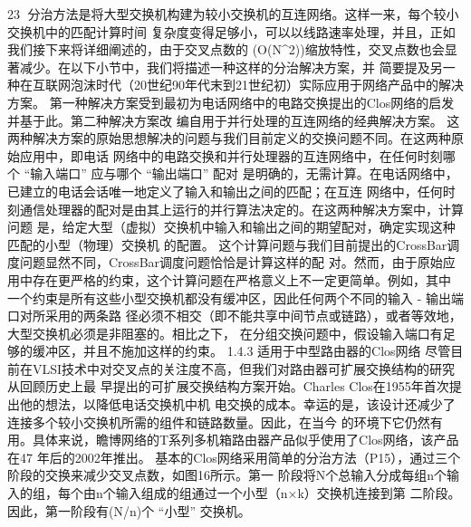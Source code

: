                                                           23
分治方法是将大型交换机构建为较小交换机的互连网络。这样一来，每个较小交换机中的匹配计算时间
复杂度变得足够小，可以以线路速率处理，并且，正如我们接下来将详细阐述的，由于交叉点数的
(O(N^{2}))缩放特性，交叉点数也会显著减少。在以下小节中，我们将描述一种这样的分治解决方案，并
简要提及另一种在互联网泡沫时代（20世纪90年代末到21世纪初）实际应用于网络产品中的解决方案。
第一种解决方案受到最初为电话网络中的电路交换提出的Clos网络的启发并基于此。第二种解决方案改
编自用于并行处理的互连网络的经典解决方案。
这两种解决方案的原始思想解决的问题与我们目前定义的交换问题不同。在这两种原始应用中，即电话
网络中的电路交换和并行处理器的互连网络中，在任何时刻哪个 “输入端口” 应与哪个 “输出端口” 配对
是明确的，无需计算。在电话网络中，已建立的电话会话唯一地定义了输入和输出之间的匹配；在互连
网络中，任何时刻通信处理器的配对是由其上运行的并行算法决定的。在这两种解决方案中，计算问题
是，给定大型（虚拟）交换机中输入和输出之间的期望配对，确定实现这种匹配的小型（物理）交换机
的配置。
这个计算问题与我们目前提出的CrossBar调度问题显然不同，CrossBar调度问题恰恰是计算这样的配
对。然而，由于原始应用中存在更严格的约束，这个计算问题在严格意义上不一定更简单。例如，其中
一个约束是所有这些小型交换机都没有缓冲区，因此任何两个不同的输入 - 输出端口对所采用的两条路
径必须不相交（即不能共享中间节点或链路），或者等效地，大型交换机必须是非阻塞的。相比之下，
在分组交换问题中，假设输入端口有足够的缓冲区，并且不施加这样的约束。
1.4.3 适用于中型路由器的Clos网络
尽管目前在VLSI技术中对交叉点的关注度不高，但我们对路由器可扩展交换结构的研究从回顾历史上最
早提出的可扩展交换结构方案开始。Charles Clos在1955年首次提出他的想法，以降低电话交换机中机
电交换的成本。幸运的是，该设计还减少了连接多个较小交换机所需的组件和链路数量。因此，在当今
的环境下它仍然有用。具体来说，瞻博网络的T系列多机箱路由器产品似乎使用了Clos网络，该产品在47
年后的2002年推出。
基本的Clos网络采用简单的分治方法（P15），通过三个阶段的交换来减少交叉点数，如图16所示。第一
阶段将N个总输入分成每组n个输入的组，每个由n个输入组成的组通过一个小型（n×k）交换机连接到第
二阶段。因此，第一阶段有(N/n)个 “小型” 交换机。




